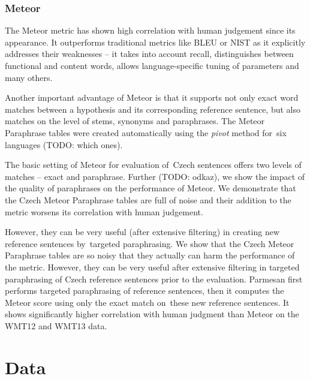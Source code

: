 \documentclass[11pt]{article}
\begin{document}
\subsubsection{Meteor}
The Meteor metric \cite{meteor-wmt:2011} has shown high correlation with human 
judgement since its appearance. It outperforms traditional metrics like BLEU \cite{bleu} 
or NIST \cite{nist} as it explicitly addresses their weaknesses -- it takes into account 
recall, distinguishes between functional and content words, allows language-specific 
tuning of parameters and many others.

Another important advantage of Meteor is that it supports not only exact word matches 
between a hypothesis and its corresponding reference sentence, but also matches on the 
level of stems, synonyms and paraphrases. The Meteor Paraphrase tables \cite{meteor-tables} 
were created automatically using the \textit{pivot} method \cite{pivoting} for~six languages 
(TODO: which ones).

The basic setting of Meteor for evaluation of~Czech sentences offers two levels of matches -- 
exact and paraphrase. Further (TODO: odkaz), we show the impact of the quality of paraphrases 
on the performance of Meteor. We demonstrate that the Czech Meteor Paraphrase tables are full 
of noise and their addition to the metric worsens its correlation with human judgement. 

However, they can be very useful (after extensive filtering) in creating new reference sentences 
by~targeted paraphrasing. 
We show that the Czech Meteor Paraphrase tables are so noisy that they actually can harm 
the performance of the metric. However, they can be very useful after extensive filtering 
in targeted paraphrasing of Czech reference sentences prior to the evaluation.
Parmesan first performs targeted paraphrasing of reference sentences, then it computes 
the Meteor score using only the exact match on~these new reference sentences. It shows 
significantly higher correlation with human judgment than Meteor on the WMT12 and WMT13 data. 

\section{Data}
\end{document}
